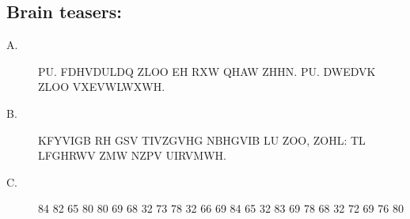 \documentclass{article}
\begin{document}
\subsection*{Brain teasers:}
\begin{description}
\item[A.] PU. FDHVDULDQ ZLOO EH RXW QHAW ZHHN. PU. DWEDVK ZLOO VXEVWLWXWH. %

\item[B.] KFYVIGB RH GSV TIVZGVHG NBHGVIB LU ZOO, ZOHL: TL LFGHRWV ZMW NZPV UIRVMWH. %

\item[C.] 84 82 65 80 80 69 68 32 73 78 32 66 69 84 65 32 83 69 78 68 32 72 69 76 80 %

\end{description}
\end{document}
